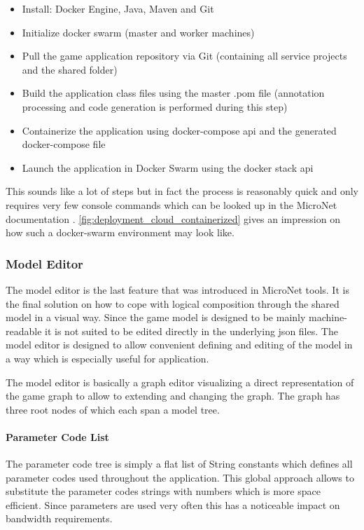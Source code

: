 \begin{itemize}
  \item Install: Docker Engine, Java, Maven and Git
  \item Initialize docker swarm (master and worker machines)
  \item Pull the game application repository via Git (containing all service
  projects and the shared folder)
  \item Build the application class files using the master .pom file (annotation
  processing and code generation is performed during this step)
  \item Containerize the application using docker-compose \gls{api} and the generated
  docker-compose file
  \item Launch the application in Docker Swarm using the docker stack \gls{api} 
\end{itemize}

This sounds like a lot of steps but in fact the process is reasonably quick and
only requires very few console commands which can be looked up in the MicroNet
documentation \cite{micronet2017doku}.
\autoref{fig:deployment_cloud_containerized} gives an impression on how such a
docker-swarm environment may look like.

\subsubsection{Model Editor}

The model editor is the last feature that was introduced in MicroNet tools. It
is the final solution on how to cope with logical \ms{} composition through the
shared model in a visual way. Since the game model is designed to be mainly
machine-readable it is not suited to be edited directly in the underlying
\gls{json} files. The model editor is designed to allow convenient defining and
editing of the model in a way which is especially useful for \og{} application.

The model editor is basically a graph editor visualizing a direct representation
of the game graph to allow to extending and changing the graph. The graph has
three root nodes of which each span a model tree.

\paragraph{Parameter Code List}

The parameter code tree is simply a flat list of String constants which defines
all parameter codes used throughout the application. This global approach allows
to substitute the parameter codes strings with numbers which is more space
efficient. Since parameters are used very often this has a noticeable impact on
bandwidth requirements.

